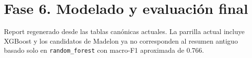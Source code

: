 \section*{Fase 6. Modelado y evaluación final}
Report regenerado desde las tablas canónicas actuales. La parrilla actual incluye XGBoost y los candidatos de Madelon ya no corresponden al resumen antiguo basado solo en \texttt{random\_forest} con macro-F1 aproximada de 0.766.
